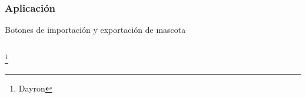 \documentclass[14pt]{beamer}
\begin{document}
\begin{frame}
\frametitle{Aplicación}
Botones de importación y exportación de mascota
\begin{columns}
\begin{column}{0.5\textwidth}
\begin{center}


\end{center}
\end{column}

\end{columns}
\footnote{Dayron}
\end{frame}
\end{document}
